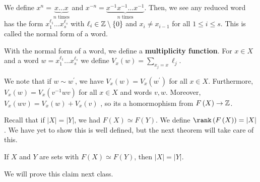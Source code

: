 \begin{remark}
	We define \(x^{n} = \underbrace{x\ldots x}_{n \text{ times}} \) and \(x^{-n} = \underbrace{x^{-1} x^{-1} \ldots x^{-1}}_{n \text{ times}} \). Then, we see any reduced word has the form \(x_1^{\ell_1} \ldots x_{s}^{\ell_{s}}\) with \(\ell_{i} \in \mathbb{Z} \setminus \{0\} \)  and \(x_{i} \neq x_{i-1}\) for all \(1 \le i \le s\). This is called the normal form of a word.
\end{remark}
\begin{definition}
	With the normal form of a word, we define a \textbf{multiplicity function}. For \(x \in X\) and a word \(w = x_1^{\ell_1} \ldots x_{s}^{\ell_{s}}\) we define \(V_{x}\left( w \right)  = \sum_{x_{j} = x}^{} \ell_{j}\).
\end{definition}
We note that if \(w \sim w^{\prime}\), we have \(V_{x}\left( w \right)  = V_{x}\left( w^{\prime} \right) \)  for all \(x \in X\). Furthermore, \(V_{x}\left( w \right)  = V_{x}\left(v^{-1} w v\right) \)  for all \(x \in X\)  and words \(v, w\). Moreover, \(V_{x}\left( wv \right)  = V_{x}\left( w \right) +  V_{x}\left( v \right) \) , so its  a homormophism from \(F\left( X \right)  \to \mathbb{Z}\).
\begin{definition}[Rank]
	Recall that if \(\left| X \right|  = \left| Y \right| \), we had \(F\left( X \right)  \simeq F\left( Y \right) \). We define \(\rank \left( F\left( X \right)  \right)  = \left| X \right| \). We have yet to show this is well defined, but the next theorem will take care of this.
\end{definition}
\begin{theorem}
	If \(X\)  and \(Y\) are sets with \(F\left( X \right)  \simeq F\left( Y \right) \), then \(\left| X \right|  = \left| Y \right| \).
\end{theorem}
We will prove this claim next class.

